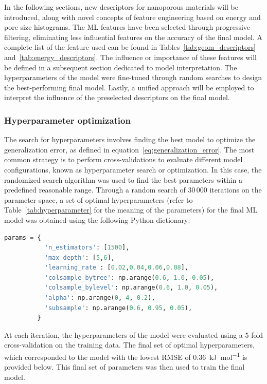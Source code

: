 \documentclass[main]{subfiles}
\begin{document}
In the following sections, new descriptors for nanoporous materials will be introduced, along with novel concepts of feature engineering based on energy and pore size histograms. The ML features have been selected through progressive filtering, eliminating less influential features on the accuracy of the final model. A complete list of the feature used can be found in Tables~\ref{tab:geom_descriptors} and~\ref{tab:energy_descriptors}. The influence or importance of these features will be defined in a subsequent section dedicated to model interpretation. The hyperparameters of the model were fine-tuned through random searches to design the best-performing final model. Lastly, a unified approach will be employed to interpret the influence of the preselected descriptors on the final model.

\subsubsection{Hyperparameter optimization}\label{sct:hyperparameter}

The search for hyperparameters involves finding the best model to optimize the generalization error, as defined in equation~\ref{eq:generalization_error}. The most common strategy is to perform cross-validations to evaluate different model configurations, known as hyperparameter search or optimization. In this case, the randomized search algorithm was used to find the best parameters within a predefined reasonable range. Through a random search of 30\,000 iterations on the parameter space, a set of optimal hyperparameters (refer to Table~\ref{tab:hyperparameter} for the meaning of the parameters) for the final ML model was obtained using the following Python dictionary:

\begin{lstlisting}[language=Python]
params = {
           'n_estimators': [1500],
           'max_depth': [5,6],
           'learning_rate': [0.02,0.04,0.06,0.08],
           'colsample_bytree': np.arange(0.6, 1.0, 0.05),
           'colsample_bylevel': np.arange(0.6, 1.0, 0.05),
           'alpha': np.arange(0, 4, 0.2),
           'subsample': np.arange(0.6, 0.95, 0.05),
         }
\end{lstlisting}

At each iteration, the hyperparameters of the model were evaluated using a 5-fold cross-validation on the training data. The final set of optimal hyperparameters, which corresponded to the model with the lowest RMSE of \SI{0.36}{\kilo\joule\per\mole} is provided below. This final set of parameters was then used to train the final model.
\end{document}
